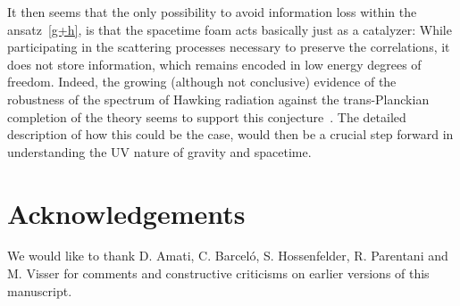 \documentclass[prd,groupedaddress, showpacs, showkeys, onecolumn, nofootinbib, 12pt]{revtex4-2}
\begin{document}
It then seems that the only possibility to avoid information loss within the ansatz~\eqref{g+h}, is that the spacetime foam acts basically just as a catalyzer: While participating in the scattering processes necessary to preserve the correlations, it does not store information, which remains encoded in low energy degrees of freedom.  Indeed, the growing (although not conclusive) evidence of the robustness of the spectrum of Hawking radiation against  the trans-Planckian completion of the theory seems to support this conjecture~\cite{Unruh:1980cg,Unruh:1994je,Brout:1995wp,Corley:1996ar,Barrabes:1998iw,Parentani:1999qv,Barrabes:2000fr,Parentani:2000ts,Parentani:2007mb,Unruh:2004zk}. The detailed description of how this could be the case, would then be a crucial step forward in understanding the UV nature of gravity and spacetime.

\section{Acknowledgements}

We would like to thank D. Amati, C. Barcel\'o, S. Hossenfelder, R. Parentani and M. Visser for comments and constructive criticisms on earlier versions of this manuscript. 
\end{document}
